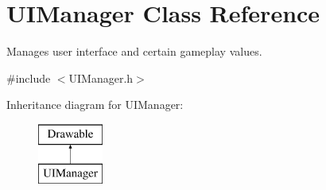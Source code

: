 \hypertarget{class_u_i_manager}{\section{U\+I\+Manager Class Reference}
\label{class_u_i_manager}
}


Manages user interface and certain gameplay values.  




{\ttfamily \#include $<$U\+I\+Manager.\+h$>$}

Inheritance diagram for U\+I\+Manager\+:\begin{figure}[H]
\begin{center}
\leavevmode
\includegraphics[height=2.000000cm]{class_u_i_manager}
\end{center}
\end{figure}
